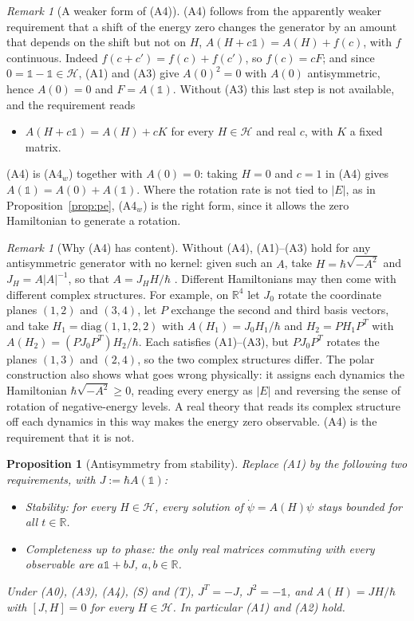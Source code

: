 \documentclass[11pt]{article}
\newtheorem{proposition}[theorem]{Proposition}
\theoremstyle{remark}
\newtheorem{remark}[theorem]{Remark}
\newcommand{\R}{\mathbb{R}}
\newcommand{\one}{\mathbb{1}}
\begin{document}
\begin{remark}[A weaker form of (A4)]\label{rem:weak}
(A4) follows from the apparently weaker requirement that a shift of the energy zero changes the generator by an amount that depends on the shift but not on $H$, $A(H+c\one)=A(H)+f(c)$, with $f$ continuous. Indeed $f(c+c')=f(c)+f(c')$, so $f(c)=cF$; and since $0=\one-\one\in\mathcal{H}$, (A1) and (A3) give $A(0)^2=0$ with $A(0)$ antisymmetric, hence $A(0)=0$ and $F=A(\one)$. Without (A3) this last step is not available, and the requirement reads
\begin{itemize}
\item[(A4$_w$)] $A(H+c\one)=A(H)+cK$ for every $H\in\mathcal{H}$ and real $c$, with $K$ a fixed matrix.
\end{itemize}
(A4) is (A4$_w$) together with $A(0)=0$: taking $H=0$ and $c=1$ in (A4) gives $A(\one)=A(0)+A(\one)$. Where the rotation rate is not tied to $|E|$, as in Proposition~\ref{prop:pe}, (A4$_w$) is the right form, since it allows the zero Hamiltonian to generate a rotation.
\end{remark}

\begin{remark}[Why (A4) has content]
Without (A4), (A1)--(A3) hold for any antisymmetric generator with no kernel: given such an $A$, take $H=\hbar\sqrt{-A^2}$ and $J_H=A|A|^{-1}$, so that $A=J_HH/\hbar$ \cite{Aste,Vaughan}. Different Hamiltonians may then come with different complex structures. For example, on $\R^4$ let $J_0$ rotate the coordinate planes $(1,2)$ and $(3,4)$, let $P$ exchange the second and third basis vectors, and take $H_1=\mathrm{diag}(1,1,2,2)$ with $A(H_1)=J_0H_1/\hbar$ and $H_2=PH_1P^T$ with $A(H_2)=(PJ_0P^T)H_2/\hbar$. Each satisfies (A1)--(A3), but $PJ_0P^T$ rotates the planes $(1,3)$ and $(2,4)$, so the two complex structures differ. The polar construction also shows what goes wrong physically: it assigns each dynamics the Hamiltonian $\hbar\sqrt{-A^2}\ge0$, reading every energy as $|E|$ and reversing the sense of rotation of negative-energy levels. A real theory that reads its complex structure off each dynamics in this way makes the energy zero observable. (A4) is the requirement that it is not.
\end{remark}

\begin{proposition}[Antisymmetry from stability]\label{prop:stable}
Replace (A1) by the following two requirements, with $J:=\hbar A(\one)$:
\begin{itemize}
\item[(S)] \emph{Stability:} for every $H\in\mathcal{H}$, every solution of $\dot\psi=A(H)\psi$ stays bounded for all $t\in\R$.
\item[(T)] \emph{Completeness up to phase:} the only real matrices commuting with every observable are $a\one+bJ$, $a,b\in\R$.
\end{itemize}
Under (A0), (A3), (A4), (S) and (T), $J^T=-J$, $J^2=-\one$, and $A(H)=JH/\hbar$ with $[J,H]=0$ for every $H\in\mathcal{H}$. In particular (A1) and (A2) hold.
\end{proposition}
\end{document}
